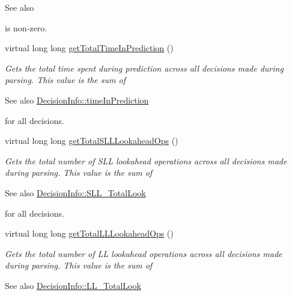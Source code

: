 \begin{DoxyCompactItemize}
\begin{DoxyCompactList}
\begin{DoxySeeAlso}{See also}
\end{DoxySeeAlso}
is non-\/zero. \end{DoxyCompactList}\item 
virtual long long \hyperlink{classantlr4_1_1atn_1_1ParseInfo_a8aea8e30f374b00aaf60c0f5a5cddd1e}{get\+Total\+Time\+In\+Prediction} ()
\begin{DoxyCompactList}\small\item\em Gets the total time spent during prediction across all decisions made during parsing. This value is the sum of \begin{DoxySeeAlso}{See also}
\hyperlink{classantlr4_1_1atn_1_1DecisionInfo_ae758fc847ab20067a1136393a0ae49c3}{Decision\+Info\+::time\+In\+Prediction}


\end{DoxySeeAlso}
for all decisions. \end{DoxyCompactList}\item 
virtual long long \hyperlink{classantlr4_1_1atn_1_1ParseInfo_ab38049ea664df2514084fd24ee7cdc87}{get\+Total\+S\+L\+L\+Lookahead\+Ops} ()
\begin{DoxyCompactList}\small\item\em Gets the total number of S\+LL lookahead operations across all decisions made during parsing. This value is the sum of \begin{DoxySeeAlso}{See also}
\hyperlink{classantlr4_1_1atn_1_1DecisionInfo_a63d0122173acb50fa288e876220cdb90}{Decision\+Info\+::\+S\+L\+L\+\_\+\+Total\+Look}


\end{DoxySeeAlso}
for all decisions. \end{DoxyCompactList}\item 
virtual long long \hyperlink{classantlr4_1_1atn_1_1ParseInfo_ae5e5cadb9cf4df3fff49583f0c46afc4}{get\+Total\+L\+L\+Lookahead\+Ops} ()
\begin{DoxyCompactList}\small\item\em Gets the total number of LL lookahead operations across all decisions made during parsing. This value is the sum of \begin{DoxySeeAlso}{See also}
\hyperlink{classantlr4_1_1atn_1_1DecisionInfo_a74ee8e588415c652036556738bdd2a04}{Decision\+Info\+::\+L\+L\+\_\+\+Total\+Look}



\end{DoxySeeAlso}
\end{DoxyCompactList}
\end{DoxyCompactItemize}
